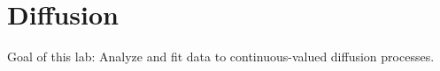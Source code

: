 \chapter{Diffusion}

Goal of this lab:
Analyze and fit data to continuous-valued diffusion processes.

